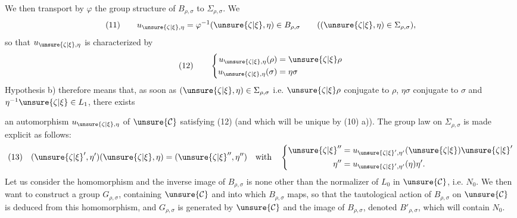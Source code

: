 We then transport by $\varphi$ the group structure of $B_{\rho,\sigma}$ to $\Sigma_{\rho,\sigma}$. We 
\[
(11)\qquad u_{\unsure{\zeta|\xi},\eta}=\varphi^{-1}(\unsure{\zeta|\xi},\eta)\in B_{\rho,\sigma}
\qquad((\unsure{\zeta|\xi},\eta)\in\Sigma_{\rho,\sigma}),
\]
so that  $u_{\unsure{\zeta|\xi},\eta}$ is characterized by
\[
(12)\qquad\left\{\begin{aligned}
u_{\unsure{\zeta|\xi},\eta}(\rho)&=\unsure{\zeta|\xi}\rho\\
u_{\unsure{\zeta|\xi},\eta}(\sigma)&=\eta\sigma
\end{aligned}\right.
\]
Hypothesis b) therefore means that, as soon as $(\unsure{\zeta|\xi},\eta)\in\Sigma_{\rho,\sigma}$ i.e. $\unsure{\zeta|\xi}\rho$ conjugate to $\rho$, $\eta\sigma$ conjugate to $\sigma$ and $\eta^{-1}\unsure{\zeta|\xi}\in L_1$, there exists

an automorphism $u_{\unsure{\zeta|\xi},\eta}$ of $\unsure{\mathcal{C}}$ satisfying (12) (and which will be unique by (10) a)). The group law on $\Sigma_{\rho,\sigma}$ is made explicit as follows:
\[
(13)\quad(\unsure{\zeta|\xi}',\eta')(\unsure{\zeta|\xi},\eta)=(\unsure{\zeta|\xi}'',\eta'')\quad\text{with}\quad
\left\{\begin{aligned}
\unsure{\zeta|\xi}''&=u_{\unsure{\zeta|\xi}',\eta'}(\unsure{\zeta|\xi})\unsure{\zeta|\xi}'\\
\eta''&=u_{\unsure{\zeta|\xi}',\eta'}(\eta)\eta'.
\end{aligned}\right.
\]
Let us consider the homomorphism 
 
and the inverse image of $B_{\rho,\sigma}$ is none other than the normalizer of $L_0$ in $\unsure{\mathcal{C}}$, i.e. $N_0$. We then want to construct a group $G_{\rho,\sigma}$, containing $\unsure{\mathcal{C}}$  and into which  $B_{\rho,\sigma}$ maps, so that the tautological action of $B_{\rho,\sigma}$ on $\unsure{\mathcal{C}}$ is deduced from this homomorphism, and $G_{\rho,\sigma}$ is generated by $\unsure{\mathcal{C}}$ and the image of $B_{\rho,\sigma}$, denoted $B'_{\rho,\sigma}$, which will contain  $N_0$.

